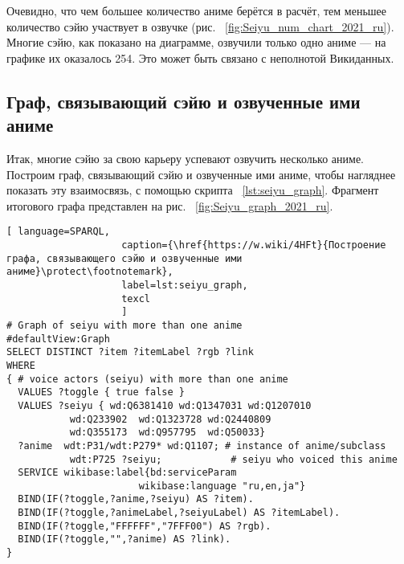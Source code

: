 Очевидно, что чем большее количество аниме берётся в расчёт, тем меньшее количество сэйю участвует в озвучке (рис. ~\ref{fig:Seiyu_num_chart_2021_ru}). Многие сэйю, как показано на диаграмме, озвучили только одно аниме — на графике их оказалось 254. Это может быть связано с неполнотой Викиданных. 

\begin{figure*}[h]

    \setlength{\fboxsep}{0pt}%
    \setlength{\fboxrule}{1pt}%
	\caption[График, который показывает число ролей, озвученных различными сэйю, 2021.]{График, который показывает число ролей, озвученных различными сэйю, 2021. График построена на основе данных, полученных с помощью запроса~\protect\ref{lst:seiyu_titles_graph}.}%
    \label{fig:Seiyu_num_chart_2021_ru}%
\end{figure*} 

\subsection{Граф, связывающий сэйю и озвученные ими аниме}

Итак, многие сэйю за свою карьеру успевают озвучить несколько аниме. Построим граф, связывающий сэйю и озвученные ими аниме, чтобы нагляднее показать эту взаимосвязь, с помощью скрипта ~\protect\ref{lst:seiyu_graph}. Фрагмент итогового графа представлен на рис. ~\ref{fig:Seiyu_graph_2021_ru}. 

\lstset{numbers=left, firstnumber=1, frame=single}
\begin{lstlisting}[ language=SPARQL, 
                    caption={\href{https://w.wiki/4HFt}{Построение графа, связывающего сэйю и озвученные ими аниме}\protect\footnotemark},
                    label=lst:seiyu_graph,
                    texcl 
                    ]
# Graph of seiyu with more than one anime
#defaultView:Graph
SELECT DISTINCT ?item ?itemLabel ?rgb ?link
WHERE
{ # voice actors (seiyu) with more than one anime
  VALUES ?toggle { true false }
  VALUES ?seiyu { wd:Q6381410 wd:Q1347031 wd:Q1207010 
           wd:Q233902  wd:Q1323728 wd:Q2440809 
           wd:Q355173  wd:Q957795  wd:Q50033}
  ?anime  wdt:P31/wdt:P279* wd:Q1107; # instance of anime/subclass
           wdt:P725 ?seiyu;            # seiyu who voiced this anime 
  SERVICE wikibase:label{bd:serviceParam
					   wikibase:language "ru,en,ja"}
  BIND(IF(?toggle,?anime,?seiyu) AS ?item).
  BIND(IF(?toggle,?animeLabel,?seiyuLabel) AS ?itemLabel).
  BIND(IF(?toggle,"FFFFFF","7FFF00") AS ?rgb).
  BIND(IF(?toggle,"",?anime) AS ?link).
}
\end{lstlisting}%
\lstset{numbers=none}


